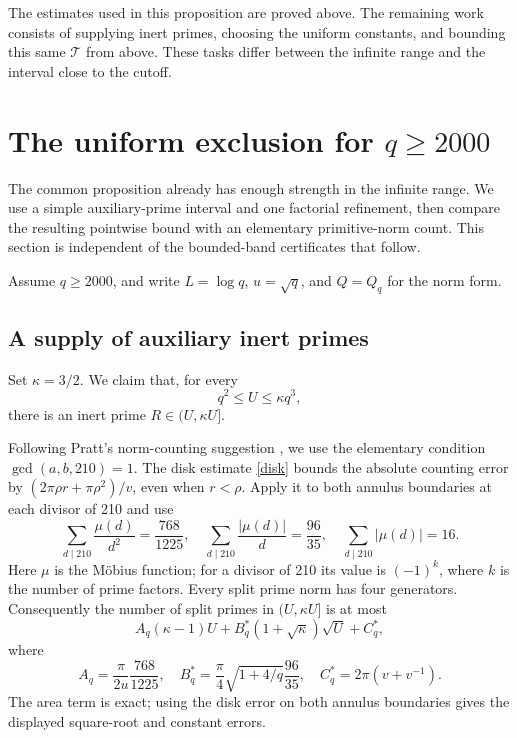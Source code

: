 \documentclass[11pt]{article}
\newcommand{\Tn}{\mathcal T}
\begin{document}
The estimates used in this proposition are proved above. The remaining
work consists of supplying inert primes, choosing the uniform constants,
and bounding this same \(\Tn\) from above. These tasks differ between
the infinite range and the interval close to the cutoff.

\section{The uniform exclusion for \texorpdfstring{\(q\ge2000\)}{q >= 2000}}\label{large}
The common proposition already has enough strength in the infinite
range. We use a simple auxiliary-prime interval and one factorial
refinement, then compare the resulting pointwise bound with an
elementary primitive-norm count. This section is independent of the
bounded-band certificates that follow.

Assume \(q\ge2000\), and write \(L=\log q\), \(u=\sqrt q\),
and \(Q=Q_q\) for the norm form.

\subsection{A supply of auxiliary inert primes}

Set $\kappa=3/2$. We claim that, for every
\begin{equation}\label{Urange}
 q^2\le U\le\kappa q^3,
\end{equation}
there is an inert prime $R\in(U,\kappa U]$.

Following Pratt's norm-counting suggestion \cite{pratt}, we use
the elementary condition \(\gcd(a,b,210)=1\).
The disk estimate \eqref{disk} bounds the absolute counting error by
\((2\pi\rho r+\pi\rho^2)/v\), even when \(r<\rho\).
Apply it to both annulus boundaries at each divisor of 210 and use
\[
 \sum_{d\mid210}\frac{\mu(d)}{d^2}=\frac{768}{1225},\quad
 \sum_{d\mid210}\frac{|\mu(d)|}{d}=\frac{96}{35},\quad
 \sum_{d\mid210}|\mu(d)|=16.
\]
Here \(\mu\) is the M\"obius function; for a divisor of 210 its value
is \((-1)^k\), where \(k\) is the number of prime factors.
Every split prime norm has four generators. Consequently the number
of split primes in $(U,\kappa U]$ is at most
\[
 A_q(\kappa-1)U+B_q^*(1+\sqrt\kappa)\sqrt U+C_q^*,
\]
where
\[
 A_q=\frac{\pi}{2u}\frac{768}{1225},\quad
 B_q^*=\frac\pi4\sqrt{1+4/q}\frac{96}{35},\quad
 C_q^*=2\pi(v+v^{-1}).
\]
The area term is exact; using the disk error on both annulus
boundaries gives the displayed square-root and constant errors.
\end{document}
